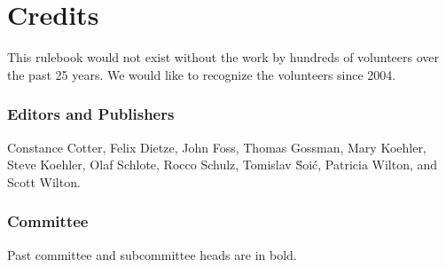 \renewcommand\thepart{} %
\renewcommand\partname{} %
\part{Credits} 
This rulebook would not exist without the work by hundreds of volunteers over the past 25 years.
We would like to recognize the volunteers since 2004.

\section{Editors and Publishers}
Constance Cotter,
Felix Dietze,
John Foss,
Thomas Gossman,
Mary  Koehler,
Steve Koehler,
Olaf Schlote,
Rocco Schulz,
Tomislav \u{S}oi\'{c},
Patricia Wilton,
and Scott Wilton.

\section{Committee}

Past committee and subcommittee heads are in bold.

